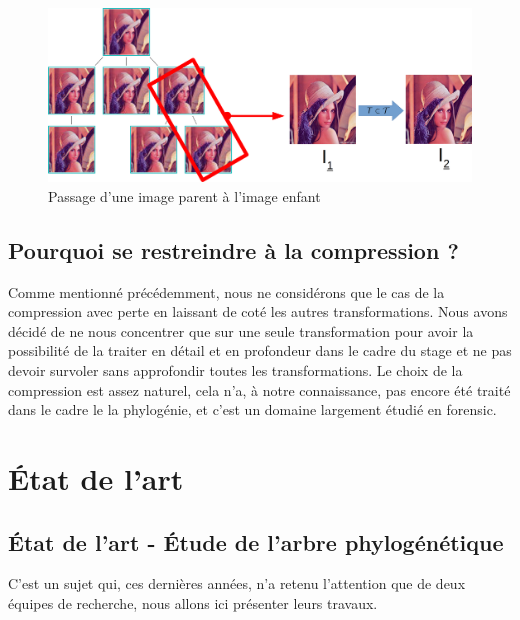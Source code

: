 \documentclass[utf8]{stageM2R} %
\begin{document}
\begin{figure}
  \begin{center}
    \includegraphics[width=120mm]{images/tree_extract}
    \caption{Passage d'une image parent à l'image enfant}
    \label{fig:tree_extract}
  \end{center}
\end{figure}

\section{Pourquoi se restreindre à la compression ?}
Comme mentionné précédemment, nous ne considérons que le cas de la compression avec perte en laissant de coté les autres transformations. Nous avons décidé de ne nous concentrer que sur une seule transformation pour avoir la possibilité de la traiter en détail et en profondeur dans le cadre du stage et ne pas devoir survoler sans approfondir toutes les transformations. Le choix de la compression est assez naturel, cela n'a, à notre connaissance, pas encore été traité dans le cadre le la phylogénie, et c'est un domaine largement étudié en forensic.

\chapter{État de l'art}
\section{État de l'art - Étude de l'arbre phylogénétique}
C'est un sujet qui, ces dernières années, n'a retenu l'attention que de deux équipes de recherche, nous allons ici présenter leurs travaux.
\end{document}
